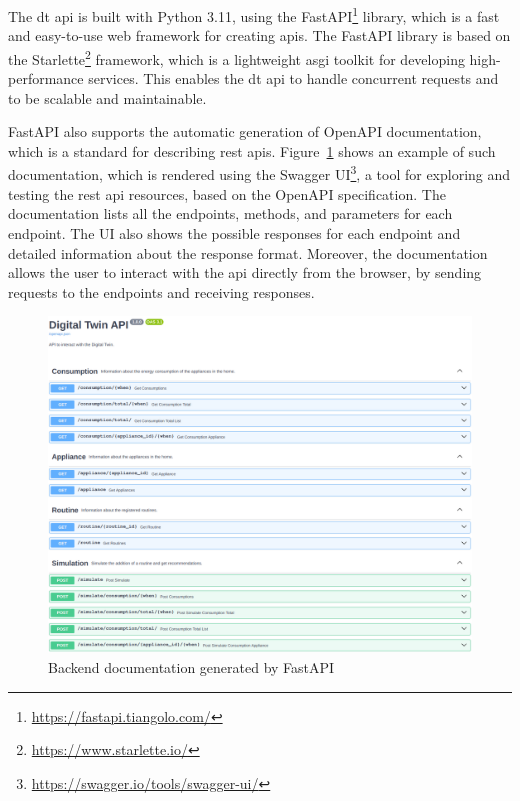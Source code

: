 The \acrshort{dt} \acrshort{api} is built with Python 3.11, using the FastAPI\footnote{\url{https://fastapi.tiangolo.com/}} library, which is a fast and easy-to-use web framework for creating \acrshort{api}s. The FastAPI library is based on the Starlette\footnote{\url{https://www.starlette.io/}} framework, which is a lightweight \acrfull{asgi} toolkit for developing high-performance services. This enables the \acrshort{dt} \acrshort{api} to handle concurrent requests and to be scalable and maintainable.

FastAPI also supports the automatic generation of OpenAPI documentation, which is a standard for describing \acrshort{rest} \acrshort{api}s. Figure~\ref{fig:backend_swagger} shows an example of such documentation, which is rendered using the Swagger UI\footnote{\url{https://swagger.io/tools/swagger-ui/}}, a tool for exploring and testing the \acrshort{rest} \acrshort{api} resources, based on the OpenAPI specification. The documentation lists all the endpoints, methods, and parameters for each endpoint. The UI also shows the possible responses for each endpoint and detailed information about the response format. Moreover, the documentation allows the user to interact with the \acrshort{api} directly from the browser, by sending requests to the endpoints and receiving responses.

\begin{figure}
    \centering
    \includegraphics[width=\textwidth]{images/backend_swagger.png}
    \caption{Backend documentation generated by FastAPI}%
    \label{fig:backend_swagger}
\end{figure}


